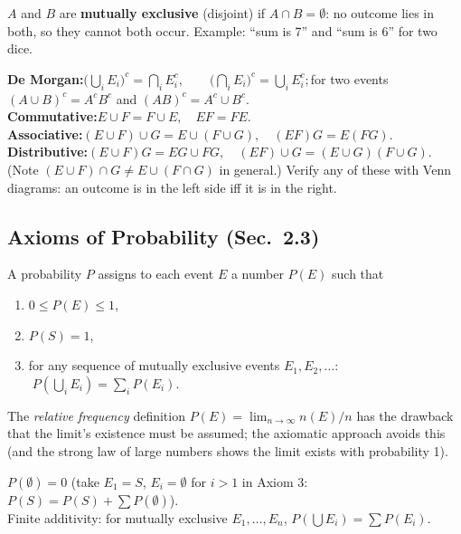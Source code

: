 \documentclass[11pt]{article}
\let\oldsubsection\subsection
\renewcommand{\subsection}{\Needspace{14\baselineskip}\oldsubsection}
\begin{document}
\begin{defbox}
$A$ and $B$ are \textbf{mutually exclusive} (disjoint) if $A\cap B=\emptyset$: no outcome lies in both, so they cannot both occur. Example: ``sum is 7'' and ``sum is 6'' for two dice.
\end{defbox}

\begin{thmbox}
\textbf{De Morgan:}\quad $\Big(\bigcup_iE_i\Big)^c=\bigcap_iE_i^c,\qquad\Big(\bigcap_iE_i\Big)^c=\bigcup_iE_i^c;$\quad for two events $(A\cup B)^c=A^cB^c$ and $(AB)^c=A^c\cup B^c$.\\[2pt]
\textbf{Commutative:}\quad $E\cup F=F\cup E,\quad EF=FE.$\\
\textbf{Associative:}\quad $(E\cup F)\cup G=E\cup(F\cup G),\quad (EF)G=E(FG).$\\
\textbf{Distributive:}\quad $(E\cup F)G=EG\cup FG,\quad (EF)\cup G=(E\cup G)(F\cup G).$\\
(Note $(E\cup F)\cap G\ne E\cup(F\cap G)$ in general.) Verify any of these with Venn diagrams: an outcome is in the left side iff it is in the right.
\end{thmbox}

\subsection{Axioms of Probability (Sec.\ 2.3)}

\begin{defbox}
A probability $P$ assigns to each event $E$ a number $P(E)$ such that
\begin{enumerate}
\item $0\le P(E)\le1$,
\item $P(S)=1$,
\item for any sequence of mutually exclusive events $E_1,E_2,\dots$: $\;P\!\left(\bigcup_{i}E_i\right)=\sum_i P(E_i)$.
\end{enumerate}
The \emph{relative frequency} definition $P(E)=\lim_{n\to\infty}n(E)/n$ has the drawback that the limit's existence must be assumed; the axiomatic approach avoids this (and the strong law of large numbers shows the limit exists with probability 1).
\end{defbox}

\begin{thmbox}
$P(\emptyset)=0$ \quad(take $E_1=S$, $E_i=\emptyset$ for $i>1$ in Axiom 3: $P(S)=P(S)+\sum P(\emptyset)$).\\
Finite additivity: for mutually exclusive $E_1,\dots,E_n$, $P(\bigcup E_i)=\sum P(E_i)$.
\end{thmbox}
\end{document}
